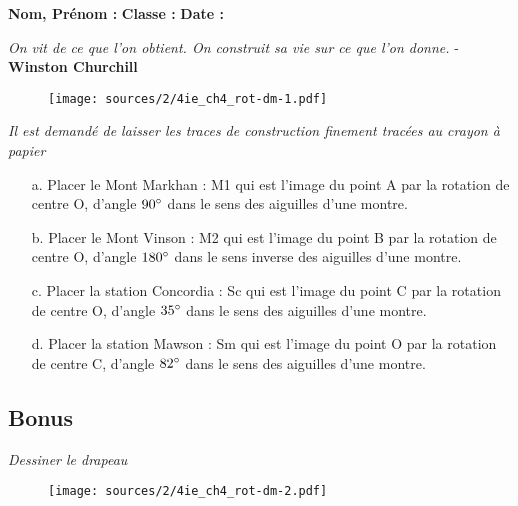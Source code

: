 \documentclass[10pt,landscape]{article}
\begin{document}

\textbf{Nom, Prénom :} \hspace{8cm} \textbf{Classe :} \hspace{3cm} \textbf{Date :}\\

\begin{center}
  \textit{On vit de ce que l’on obtient. On construit sa vie sur ce que l’on donne.}  - \textbf{Winston Churchill}
\end{center}

\setlength{\columnseprule}{1pt}

\begin{multicols}{2}

  \begin{figure}[H]
    \centering
    \texttt{[image: sources/2/4ie\_ch4\_rot-dm-1.pdf]}
  \end{figure}

  \textit{Il est demandé de laisser les traces de construction finement tracées au crayon à papier}

  \begin{enumerate}
  \item[a.] Placer le Mont Markhan : M1 qui est l'image du point A par la rotation de centre O, d'angle $90\degree$ dans le sens des aiguilles d'une montre. 
  \item[b.] Placer le Mont Vinson : M2 qui est l'image du point B par la rotation de centre O, d'angle $180\degree$ dans le sens inverse des aiguilles d'une montre.
  \item[c.] Placer la station Concordia : Sc qui est l'image du point C par la rotation de centre O, d'angle $35\degree$ dans le sens des aiguilles d'une montre. 
  \item[d.] Placer la station Mawson : Sm qui est l'image du point O par la rotation de centre C, d'angle $82\degree$ dans le sens des aiguilles d'une montre. 
  \end{enumerate}


  \setlength{\columnseprule}{0pt}

  \begin{multicols}{2}

    \subsection*{Bonus}
    \textit{Dessiner le drapeau}
    \begin{figure}[H]
      \centering
      \texttt{[image: sources/2/4ie\_ch4\_rot-dm-2.pdf]}
    \end{figure}
    

\end{multicols}
\end{multicols}
\end{document}
